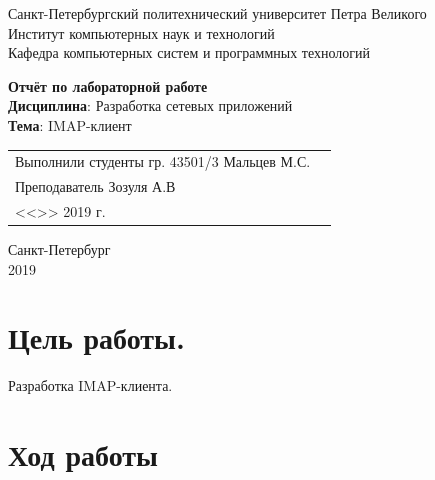 \documentclass[a4paper,14pt]{extarticle}
\begin{document}
\begin{titlepage}
\centering
Санкт-Петербургский политехнический университет Петра Великого \\
Институт компьютерных наук и технологий \\
Кафедра компьютерных систем и программных технологий \\
\vspace{5.5cm}

{\centering \textbf{Отчёт по лабораторной работе} \\ 
\vspace{0.15cm}
\textbf{Дисциплина}: Разработка сетевых приложений \\
\vspace{0.15cm}
\textbf{Тема}: IMAP-клиент } \\

\vspace{5.5cm}

\begin{table}[H]
\begin{tabular}{p{\textwidth}@{}r}
{Выполнили студенты гр. 43501/3} \hfill 
\vspace{0.2cm}
Мальцев М.С. \\ \hfill
\vspace{0.2cm}

Преподаватель \hfill 
\vspace{0.2cm}
Зозуля А.В \\ \hfill 
\vspace{0.2cm}

{} \hfill { <<\underline{\hspace{0.08\textwidth}}>> \underline{\hspace{0.2\textwidth}}2019 г.} \\
\end{tabular}
\end{table}
\vfill
{\centering Санкт-Петербург \\ 
\vspace{0.15cm}
2019}
\end{titlepage}

\section{Цель работы.}
    Разработка IMAP-клиента.

\section{Ход работы}
\end{document}
